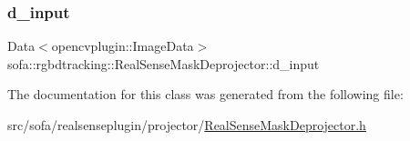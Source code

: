 \mbox{\label{classsofa_1_1rgbdtracking_1_1_real_sense_mask_deprojector_ada97b307e34090d3fb987124a936459b}} 
\subsubsection{\texorpdfstring{d\+\_\+input}{d\_input}}
{\footnotesize\ttfamily Data$<$opencvplugin\+::\+Image\+Data$>$ sofa\+::rgbdtracking\+::\+Real\+Sense\+Mask\+Deprojector\+::d\+\_\+input}



The documentation for this class was generated from the following file\+:\begin{DoxyCompactItemize}
\item 
src/sofa/realsenseplugin/projector/\hyperlink{_real_sense_mask_deprojector_8h}{Real\+Sense\+Mask\+Deprojector.\+h}\end{DoxyCompactItemize}
